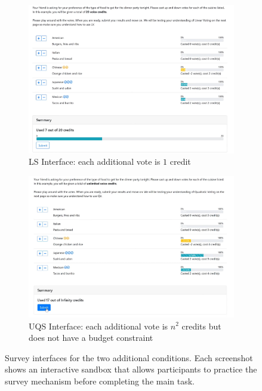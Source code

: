 \begin{figure}
    \centering
    \begin{subfigure}{0.75\textwidth}
        \centering
        \includegraphics[width=\textwidth]{content/image/linear.png}
        \caption[]{LS Interface: each additional vote is $1$ credit}
        \label{fig:qs_interface}
    \end{subfigure}
    
    \vspace*{1cm}

    \begin{subfigure}{0.75\textwidth}
        \centering
        \includegraphics[width=\textwidth]{content/image/uqs.png}
        \caption[]{UQS Interface: each additional vote is $n^2$ credits but does not have a budget constraint}
        \label{fig:css_interface}
    \end{subfigure}
    
    \caption[]{Survey interfaces for the two additional conditions. Each screenshot shows an interactive sandbox that allows  participants to practice the survey mechanism before completing the main task.}
    \label{fig:extended_interface}
\end{figure}

